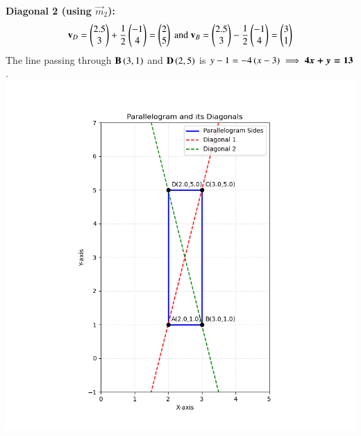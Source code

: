 \documentclass[journal]{IEEEtran}
\theoremstyle{remark}
\begin{document}
\noindent
\textbf{Diagonal 2 (using $\vec{m}_2$):}
\begin{align*}
    \vec{v}_D = \myvec{ 2.5 \\ 3} + \frac{1}{2}\myvec{ -1 \\ 4 } = \myvec{ 2 \\ 5 } \  \text{and} \ 
    \vec{v}_B = \myvec{ 2.5 \\ 3 } - \frac{1}{2}\myvec{-1 \\ 4 } = \myvec{ 3 \\ 1 }
\end{align*}
The line passing through $\mathbf{B}\left(3,1\right)$ and $\mathbf{D}\left(2,5\right)$ is $y-1 = -4\left(x-3\right) \implies \boldsymbol{4x + y = 13}$.
\newpage
    \centering
    \includegraphics[width=\columnwidth, height=0.8\textheight, keepaspectratio]{figs/diagonals.png}     
\end{document}
